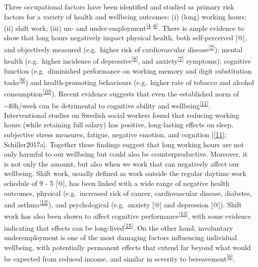 \documentclass[]{article}
\begin{document}
Three occupational factors have been identified and studied as primary risk factors for a variety of health and wellbeing outcomes: (i) (long) working hours; (ii) shift work; (iii) un- and under-employment\textsuperscript{{[}\protect\hyperlink{ref-Wong2019}{4}--\protect\hyperlink{ref-WhatWorksWellbeing2}{6}{]}}. There is ample evidence to show that long hours negatively impact physical health, both self-perceived {[}@{]}, and objectively measured (e.g.~higher risk of cardiovascular disease\textsuperscript{{[}\protect\hyperlink{ref-Bannai2014}{7}{]}}); mental health (e.g.~higher incidence of depressive\textsuperscript{{[}\protect\hyperlink{ref-Kim2016}{8}{]}}, and anxiety\textsuperscript{{[}\protect\hyperlink{ref-Bannai2014}{7}{]}} symptoms); cognitive function (e.g.~diminished performance on working memory and digit substitution tasks\textsuperscript{{[}\protect\hyperlink{ref-Kajitani2018}{9}{]}}) and health-promoting behaviours (e.g.~higher rate of tobacco and alcohol consumption\textsuperscript{{[}\protect\hyperlink{ref-Lallukka2008}{10}{]}}). Recent evidence suggests that even the established norm of \textasciitilde{}40h/week can be detrimental to cognitive ability and wellbeing\textsuperscript{{[}\protect\hyperlink{ref-Barck-Holst2017}{11}{]}}. Interventional studies on Swedish social workers found that reducing working hours (while retaining full salary) has positive, long-lasting effects on sleep, subjective stress measures, fatigue, negative emotion, and cognition {[}{[}\protect\hyperlink{ref-Barck-Holst2017}{11}{]}; Schiller2017a{]}. Together these findings suggest that long working hours are not only harmful to our wellbeing but could also be counterproductive. Moreover, it is not only the amount, but also when we work that can negatively affect our wellbeing. Shift work, usually defined as work outside the regular daytime work schedule of 9 - 5 {[}@{]}, has been linked with a wide range of negative health outcomes, physical (e.g.~increased risk of cancer, cardiovascular disease, diabetes, and asthma\textsuperscript{{[}\protect\hyperlink{ref-Maidstone2020}{12}{]}}), and psychological (e.g.~anxiety {[}@{]} and depression {[}@{]}). Shift work has also been shown to affect cognitive performance\textsuperscript{{[}\protect\hyperlink{ref-Vetter2012}{13}{]}}, with some evidence indicating that effects can be long-lived\textsuperscript{{[}\protect\hyperlink{ref-Weinmann2018}{15}{]}}. On the other hand, involuntary underemployment is one of the most damaging factors influencing individual wellbeing, with potentially permanent effects that extend far beyond what would be expected from reduced income, and similar in severity to bereavement\textsuperscript{{[}\protect\hyperlink{ref-WhatWorksWellbeing2}{6}{]}}.
\end{document}
